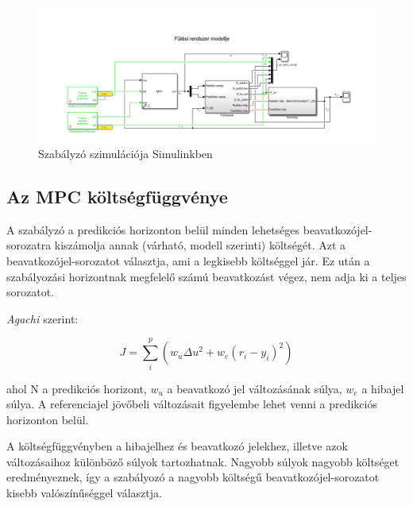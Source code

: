\begin{figure}[H]
	\centering
	\includegraphics[trim=70 0 65 0, clip,width=\textwidth]{figures/onlab/comparepng}
	\caption{Szabályzó szimulációja Simulinkben}
	\label{fig:simulink-mpc}
\end{figure}


\subsection{Az MPC költségfüggvénye}


A szabályzó a predikciós horizonton belül minden lehetséges beavatkozójel-sorozatra kiszámolja annak (várható, modell szerinti) költségét. Azt a beavatkozójel-sorozatot választja, ami a legkisebb költséggel jár. Ez után a szabályozási horizontnak megfelelő számú beavatkozást végez, nem adja ki a teljes sorozatot. 

\textit{Agachi \cite{romanMPC_Agachi}} szerint:

\begin{equation} \label{eq_mpc_cost}
J = \sum_{i}^{p} \left(w_u \Delta u^2 + w_e (r_i-y_i)^2  \right)
\end{equation}

ahol N a predikciós horizont, $w_u$ a beavatkozó jel változásának súlya, $w_e$ a hibajel súlya. A referenciajel jövőbeli változásait figyelembe lehet venni a predikciós horizonton belül.

A költségfüggvényben a hibajelhez és beavatkozó jelekhez, illetve azok változásaihoz különböző súlyok tartozhatnak.
Nagyobb súlyok nagyobb költséget eredményeznek, így a szabályozó a nagyobb költségű beavatkozójel-sorozatot kisebb valószínűséggel választja.

